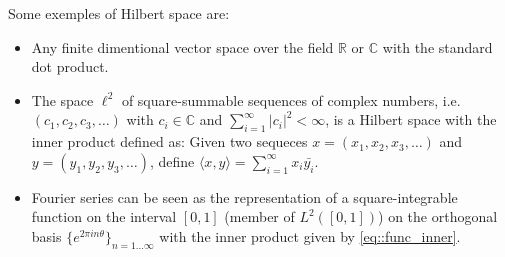 Some exemples of Hilbert space are:

\begin{itemize}
  \item Any finite dimentional vector space over the field $\mathbb{R}$ or
  $\mathbb{C}$ with the standard dot product.
  \item The space $\ell^2$ of square-summable sequences of complex numbers, i.e.
  $(c_1,c_2,c_3,\ldots)$ with $c_i \in \mathbb{C}$ and $\sum_{i=1}^\infty |c_i|^2 <
  \infty$, is a Hilbert space with the inner product defined as: Given two sequeces
  $x=(x_1,x_2,x_3,\ldots)$ and $y=(y_1,y_2,y_3,\ldots)$, define $\langle x,y
  \rangle = \sum_{i=1}^\infty x_i \bar{y_i}$.
  \item Fourier series can be seen as the representation of a square-integrable
  function on the interval $[0,1]$ (member of $L^2([0,1])$) on the orthogonal
  basis $\{e^{2\pi i n \theta}\}_{n=1\ldots\infty}$ with the inner product given
  by \ref{eq::func_inner}.
\end{itemize}

